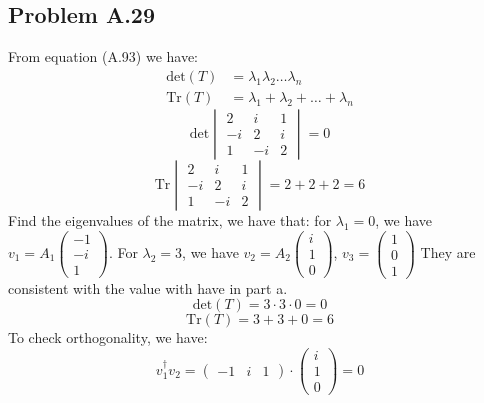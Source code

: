 \documentclass{article}
\begin{document}
\subsection*{Problem A.29}
From equation (A.93) we have: 
\begin{align*}
    \text{det}(T) &= \lambda_1 \lambda_2 \dots \lambda_n \\
    \text{Tr}(T) &= \lambda_1 + \lambda_2 + \dots + \lambda_n
\end{align*}
\begin{equation}
    \text{det}
    \begin{vmatrix}
        2  & i & 1 \\
        -i & 2 & i \\
        1  & -i & 2
    \end{vmatrix} 
    = 0
\end{equation}
\begin{equation}
    \text{Tr}
    \begin{vmatrix}
        2  & i & 1 \\
        -i & 2 & i \\
        1  & -i & 2
    \end{vmatrix}
    = 2 + 2 + 2 = 6
\end{equation}
Find the eigenvalues of the matrix, we have that: 
for \(\lambda_1 = 0\), we have 
\(v_1 = A_1
\begin{pmatrix}
    -1 \\
    -i \\
    1
\end{pmatrix}
\).
For \(\lambda_2 = 3\), we have 
\(v_2 = A_2
\begin{pmatrix}
    i \\
    1 \\
    0
\end{pmatrix}
\), 
\(v_3 =
\begin{pmatrix}
    1 \\
    0 \\
    1
\end{pmatrix}
\)
They are consistent with the value with have in part a. 
\[\text{det}(T) = 3 \cdot 3 \cdot 0 = 0\]
\[\text{Tr}(T) = 3 + 3 + 0 = 6\]
To check orthogonality, we have:
\begin{equation*}
    v_1^\dagger v_2 = 
    \begin{pmatrix}
        -1 & i & 1
    \end{pmatrix}
    \cdot
    \begin{pmatrix}
        i \\
        1 \\
        0
    \end{pmatrix}
    = 0
\end{equation*}
\end{document}
